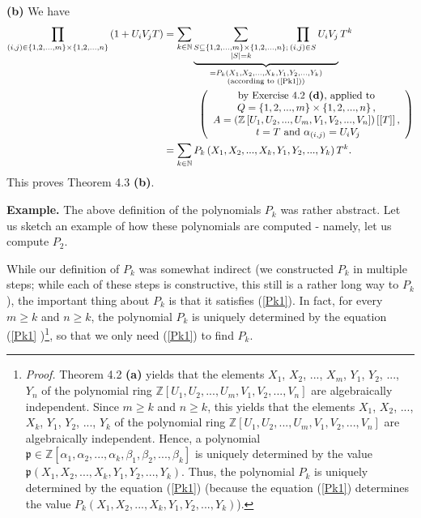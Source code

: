 \documentclass[numbers=enddot,12pt,final,onecolumn,notitlepage]{scrartcl}%
\begin{document}
\textbf{(b)} We have%
\begin{align*}
\prod_{\left(  i,j\right)  \in\left\{  1,2,...,m\right\}  \times\left\{
1,2,...,n\right\}  }\left(  1+U_{i}V_{j}T\right)   &  =\sum_{k\in\mathbb{N}%
}\underbrace{\sum_{\substack{S\subseteq\left\{  1,2,...,m\right\}
\times\left\{  1,2,...,n\right\}  ;\\\left\vert S\right\vert =k}%
}\prod_{\left(  i,j\right)  \in S}U_{i}V_{j}}_{\substack{=P_{k}\left(
X_{1},X_{2},...,X_{k},Y_{1},Y_{2},...,Y_{k}\right)  \\\text{(according to
(\ref{Pk1}))}}}T^{k}\\
&  \ \ \ \ \ \ \ \ \ \ \left(
\begin{array}
[c]{c}%
\text{by Exercise 4.2 \textbf{(d)}, applied to}\\
Q=\left\{  1,2,...,m\right\}  \times\left\{  1,2,...,n\right\}  \text{,}\\
A=\left(  \mathbb{Z}\left[  U_{1},U_{2},...,U_{m},V_{1},V_{2},...,V_{n}%
\right]  \right)  \left[  \left[  T\right]  \right]  \text{,}\\
\text{ }t=T\text{ and }\alpha_{\left(  i,j\right)  }=U_{i}V_{j}%
\end{array}
\right) \\
&  =\sum_{k\in\mathbb{N}}P_{k}\left(  X_{1},X_{2},...,X_{k},Y_{1}%
,Y_{2},...,Y_{k}\right)  T^{k}.
\end{align*}
This proves Theorem 4.3 \textbf{(b)}.

\textbf{Example.} The above definition of the polynomials $P_{k}$ was rather
abstract. Let us sketch an example of how these polynomials are computed -
namely, let us compute $P_{2}$.

While our definition of $P_{k}$ was somewhat indirect (we constructed $P_{k}$
in multiple steps; while each of these steps is constructive, this still is a
rather long way to $P_{k}$), the important thing about $P_{k}$ is that it
satisfies (\ref{Pk1}). In fact, for every $m\geq k$ and $n\geq k$, the
polynomial $P_{k}$ is uniquely determined by the equation (\ref{Pk1}%
)\footnote{\textit{Proof.} Theorem 4.2 \textbf{(a)} yields that the elements
$X_{1}$, $X_{2}$, $...$, $X_{m}$, $Y_{1}$, $Y_{2}$, $...$, $Y_{n}$ of the
polynomial ring $\mathbb{Z}\left[  U_{1},U_{2},...,U_{m},V_{1},V_{2}%
,...,V_{n}\right]  $ are algebraically independent. Since $m\geq k$ and $n\geq
k$, this yields that the elements $X_{1}$, $X_{2}$, $...$, $X_{k}$, $Y_{1}$,
$Y_{2}$, $...$, $Y_{k}$ of the polynomial ring $\mathbb{Z}\left[  U_{1}%
,U_{2},...,U_{m},V_{1},V_{2},...,V_{n}\right]  $ are algebraically
independent. Hence, a polynomial $\mathfrak{p}\in\mathbb{Z}\left[  \alpha
_{1},\alpha_{2},...,\alpha_{k},\beta_{1},\beta_{2},...,\beta_{k}\right]  $ is
uniquely determined by the value $\mathfrak{p}\left(  X_{1},X_{2}%
,...,X_{k},Y_{1},Y_{2},...,Y_{k}\right)  $. Thus, the polynomial $P_{k}$ is
uniquely determined by the equation (\ref{Pk1}) (because the equation
(\ref{Pk1}) determines the value $P_{k}\left(  X_{1},X_{2},...,X_{k}%
,Y_{1},Y_{2},...,Y_{k}\right)  $).}, so that we only need (\ref{Pk1}) to find
$P_{k}$.
\end{document}

